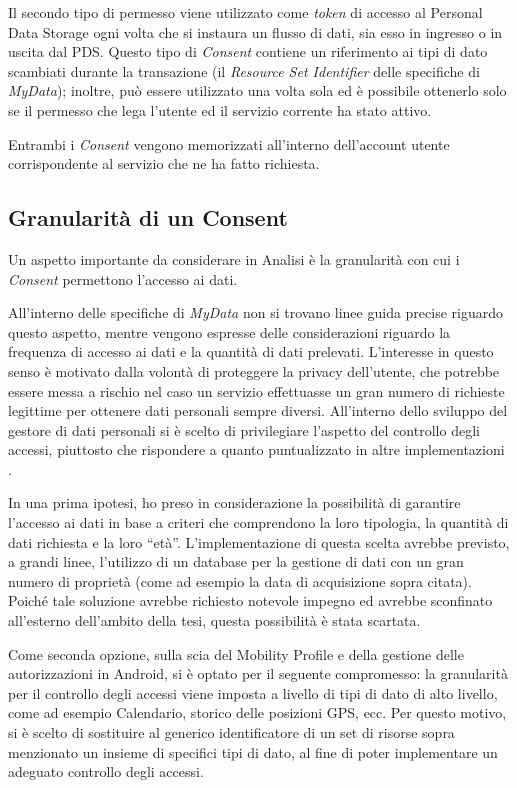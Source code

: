 Il secondo tipo di permesso viene utilizzato come \textit{token} di accesso al Personal Data Storage ogni volta che si instaura un flusso di dati, sia esso in ingresso o in uscita dal PDS. Questo tipo di \textit{Consent} contiene un riferimento ai tipi di dato scambiati durante la transazione (il \textit{Resource Set Identifier} delle specifiche di \textit{MyData}); inoltre, pu\`o essere utilizzato una volta sola ed \`e possibile ottenerlo solo se il permesso che lega l’utente ed il servizio corrente ha stato attivo.

Entrambi i \textit{Consent} vengono memorizzati all’interno dell’account utente corrispondente al servizio che ne ha fatto richiesta.

\subsection{Granularit\`a di un Consent}
\label{subsec:A-granularitaConsent}
Un aspetto importante da considerare in Analisi \`e la granularit\`a con cui i \textit{Consent} permettono l’accesso ai dati. 

All’interno delle specifiche di \textit{MyData} non si trovano linee guida precise riguardo questo aspetto, mentre vengono espresse delle considerazioni riguardo la frequenza di accesso ai dati e la quantit\`a di dati prelevati. L’interesse in questo senso \`e motivato dalla volont\`a di proteggere la privacy dell’utente, che potrebbe essere messa a rischio nel caso un servizio effettuasse un gran numero di richieste legittime per ottenere dati personali sempre diversi. All’interno dello sviluppo del gestore di dati personali si \`e scelto di privilegiare l’aspetto del controllo degli accessi, piuttosto che rispondere a quanto puntualizzato in altre implementazioni \cite{githubmobilityprofile}.

In una prima ipotesi, ho preso in considerazione la possibilit\`a di garantire l’accesso ai dati in base a criteri che comprendono la loro tipologia, la quantit\`a di dati richiesta e la loro “et\`a”. L’implementazione di questa scelta avrebbe previsto, a grandi linee, l’utilizzo di un database per la gestione di dati con un gran numero di propriet\`a (come ad esempio la data di acquisizione sopra citata). Poich\'e tale soluzione avrebbe richiesto notevole impegno ed avrebbe sconfinato all’esterno dell’ambito della tesi, questa possibilit\`a \`e stata scartata.

Come seconda opzione, sulla scia del Mobility Profile e della gestione delle autorizzazioni in Android, si \`e optato per il seguente compromesso: la granularit\`a per il controllo degli accessi viene imposta a livello di tipi di dato di alto livello, come ad esempio Calendario, storico delle posizioni GPS, ecc. Per questo motivo, si \`e scelto di sostituire al generico identificatore di un set di risorse sopra menzionato un insieme di specifici tipi di dato, al fine di poter implementare un adeguato controllo degli accessi.

